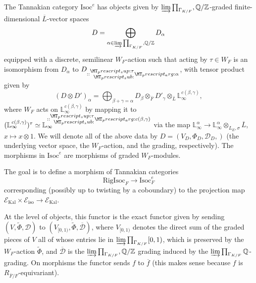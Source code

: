 \documentclass[11pt]{amsart}
\theoremstyle{definition}
\newcommand{\mc}{\mathcal}
\newcommand{\ov}{\overline}
\newcommand{\RigIsoc}{\mathrm{RigIsoc}}
\begin{document}
The Tannakian category $\text{Isoc}^{e}$ has objects given by $\varinjlim \prod_{\Gamma_{K/F}}, \mathbb{Q}/\mathbb{Z}$-graded finite-dimensional $\ov{L}$-vector spaces 
\begin{equation*}
D = \bigoplus_{\alpha \in  \varinjlim \prod_{\Gamma_{K/F}}, \mathbb{Q}/\mathbb{Z}} D_{\alpha}
\end{equation*}
equipped with a discrete, semilinear $W_{F}$-action such that acting by $\tau \in W_{F}$ is an isomorphism from $D_{\alpha}$ to $D_{\prescript{\tau}{}\alpha}$, with tensor product given by 
\begin{equation*}
(D \otimes D')_{\alpha} = \bigoplus_{\beta + \gamma = \alpha} D_{\beta} \otimes_{\ov{F}} D'_{\gamma} \otimes_{\ov{L}} \mathbb{L}_{\infty}^{c(\beta,\gamma)},
\end{equation*}
where $W_{F}$ acts on $\mathbb{L}_{\infty}^{c(\beta,\gamma)}$ by mapping it to $(\mathbb{L}_{\infty}^{c(\beta,\gamma)})^{\tau} \simeq \mathbb{L}_{\infty}^{\prescript{\tau}{}c(\beta,\gamma)}$ via the map $ \mathbb{L}_{\infty}^{\alpha} \to \mathbb{L}_{\infty}^{\alpha} \otimes_{L_{E},\sigma} \ov{L}$, $x \mapsto x \otimes 1$. We will denote all of the above data by $D = (V_{D}, \Phi_{D},\mc{D}_{D},)$ (the underlying vector space, the $W_{F}$-action, and the grading, respectively). The morphisms in $\text{Isoc}^{e}$ are morphisms of graded $W_{F}$-modules.

The goal is to define a morphism of Tannakian categories 
\begin{equation*}
   \RigIsoc_{F} \to \text{Isoc}_{F}^{e}
\end{equation*}
corresponding (possibly up to twisting by a coboundary) to the projection map $\mc{E}_{\text{Kal}} \times \mc{E}_{\text{iso}} \to \mc{E}_{\text{Kal}}$.

At the level of objects, this functor is the exact functor given by sending $(V,\tilde{\Phi},\mc{D})$ to $(V_{[0,1)},\tilde{\Phi},\ov{\mc{D}})$, where $V_{[0,1)}$ denotes the direct sum of the graded pieces of $V$ all of whose entries lie in $\varinjlim \prod_{\Gamma_{K/F}} [0,1)$, which is preserved by the $W_{F}$-action $\tilde{\Phi}$, and $\ov{\mc{D}}$ is the $\varinjlim \prod_{\Gamma_{K/F}}, \mathbb{Q}/\mathbb{Z}$ grading induced by the $\varinjlim \prod_{\Gamma_{K/F}} \mathbb{Q}$-grading. On morphisms the functor sends $f$ to $\ov{f}$ (this makes sense because $f$ is $R_{\ov{F}/F}$-equivariant).
\end{document}
